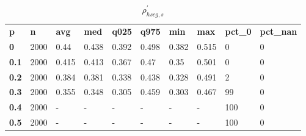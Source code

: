 \begin{table}[h]
 \centering 
\footnotesize
\caption{$\rho_{hscg,s}^\prime $}
\label{tab:alphahscgs}
\begin{tabular}[h]{| l l l l l l l l l l|
    } \hline
\textbf{ p} & \textbf{ n} & \textbf{ avg} & \textbf{ med} & \textbf{ q025} & \textbf{ q975} & \textbf{ min} & \textbf{ max} & \textbf{ pct\_0} & \textbf{ pct\_nan}
           \\
  \textbf{  0} & 2000 &  0.44 & 0.438 & 0.392 & 0.498 & 0.382 & 0.515 &   0 & 0
           \\
  \textbf{0.1} & 2000 & 0.415 & 0.413 & 0.367 &  0.47 &  0.35 & 0.501 &   0 & 0
           \\
  \textbf{0.2} & 2000 & 0.384 & 0.381 & 0.338 & 0.438 & 0.328 & 0.491 &   2 & 0
           \\
  \textbf{0.3} & 2000 & 0.355 & 0.348 & 0.305 & 0.459 & 0.303 & 0.467 &  99 & 0
           \\
  \textbf{0.4} & 2000 & - & - & - & - & - & - & 100 & 0
           \\
  \textbf{0.5} & 2000 & - & - & - & - & - & - & 100 & 0
           \\
 \hline \end{tabular}
 \end{table}
